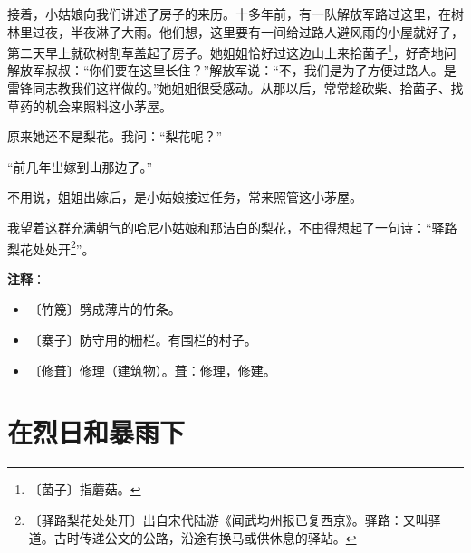 \documentclass[12pt,UTF-8,openany]{ctexbook}
\begin{document}
\begin{normalsize}
    接着，小姑娘向我们讲述了房子的来历。十多年前，有一队解放军路过这里，在树林里过夜，半夜淋了大雨。他们想，这里要有一间给过路人避风雨的小屋就好了，第二天早上就砍树割草盖起了房子。她姐姐恰好过这边山上来拾菌子\footnote{〔菌子〕指蘑菇。}，好奇地问解放军叔叔：“你们要在这里长住？”解放军说：“不，我们是为了方便过路人。是雷锋同志教我们这样做的。”她姐姐很受感动。从那以后，常常趁砍柴、拾菌子、找草药的机会来照料这小茅屋。
    
    原来她还不是梨花。我问：“梨花呢？”
    
    “前几年出嫁到山那边了。”
    
    不用说，姐姐出嫁后，是小姑娘接过任务，常来照管这小茅屋。
    
    我望着这群充满朝气的哈尼小姑娘和那洁白的梨花，不由得想起了一句诗：“驿路梨花处处开\footnote{〔驿路梨花处处开〕出自宋代陆游《闻武均州报已复西京》。驿路：又叫驿道。古时传递公文的公路，沿途有换马或供休息的驿站。}”。
    
\end{normalsize}


\newpage

\textbf{注释}：

\vspace{-1em}

\begin{itemize}
    \setlength\itemsep{-0.2em}
    \item 〔竹篾〕劈成薄片的竹条。
    \item 〔寨子〕防守用的栅栏。有围栏的村子。
    \item 〔修葺〕修理（建筑物）。葺：修理，修建。
\end{itemize}

\chapter{在烈日和暴雨下}
\end{document}
